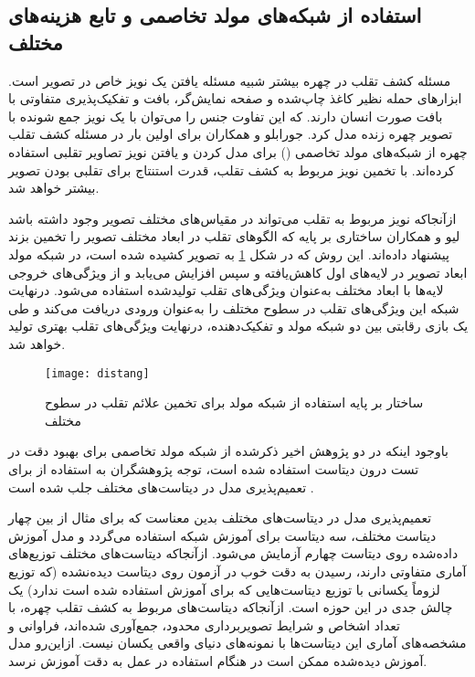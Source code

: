 \subsection{استفاده از شبکه‌های مولد تخاصمی و تابع هزینه‌های مختلف}
مسئله کشف تقلب در چهره بیشتر شبیه مسئله یافتن یک نویز خاص در تصویر است. ابزارهای حمله نظیر کاغذ چاپ‌شده و صفحه نمایش‌گر، بافت و تفکیک‌پذیری متفاوتی با بافت صورت انسان دارند. که این تفاوت جنس را می‌توان با یک نویز جمع شونده با تصویر چهره زنده مدل کرد. جورابلو و همکاران
\cite{jourabloo2018face}
برای اولین بار در مسئله کشف تقلب چهره از شبکه‌های مولد تخاصمی
 ()
\cite{goodfellow2014generative}
برای مدل کردن و یافتن نویز تصاویر تقلبی استفاده کرده‌اند. با تخمین نویز مربوط به کشف تقلب، قدرت استنتاج برای تقلبی بودن تصویر بیشتر خواهد شد.

از‌آنجا‌که نویز مربوط به تقلب می‌تواند در مقیاس‌های مختلف تصویر وجود داشته باشد لیو و همکاران
\cite{liu2020disentangling}
ساختاری بر پایه  که الگوهای تقلب در ابعاد مختلف تصویر را تخمین بزند پیشنهاد داده‌اند. این روش که در شکل 
\ref{fig:distang}
به تصویر کشیده شده است، در شبکه مولد
ابعاد تصویر در لایه‌های اول کاهش‌یافته و سپس افزایش می‌یابد و از ویژگی‌های خروجی لایه‌ها با ابعاد مختلف به‌عنوان ویژگی‌های تقلب تولید‌شده استفاده می‌شود. در‌نهایت شبکه  
این ویژگی‌های تقلب در سطوح مختلف را به‌عنوان ورودی دریافت می‌کند و طی یک بازی رقابتی بین دو شبکه مولد و تفکیک‌دهنده، در‌نهایت ویژگی‌های تقلب بهتری تولید خواهد شد. 
\begin{figure}[h]
	\centerline{\texttt{[image: distang]}}
	\caption{ساختار بر پایه استفاده از شبکه مولد برای تخمین علائم تقلب در سطوح مختلف \cite{liu2020disentangling} }
	\label{fig:distang}
\end{figure}

با‌وجود اینکه در دو پژوهش اخیر ذکر‌شده
\cite{jourabloo2018face,liu2020disentangling}
از شبکه مولد تخاصمی برای بهبود دقت در تست درون دیتاست استفاده شده است، توجه پژوهشگران به استفاده از  برای تعمیم‌پذیری مدل در دیتاست‌های مختلف جلب شده است
\cite{shao2019multi,jia2020single}.

تعمیم‌پذیری مدل در دیتاست‌های مختلف بدین معناست که برای مثال از بین چهار دیتاست مختلف، سه دیتاست برای آموزش شبکه استفاده می‌گردد و مدل آموزش داده‌شده روی دیتاست چهارم آزمایش می‌شود. از‌آنجا‌که دیتاست‌های مختلف توزیع‌های آماری متفاوتی دارند، رسیدن به دقت خوب در آزمون روی دیتاست دیده‌نشده (که توزیع لزوماً یکسانی با توزیع دیتاست‌هایی که برای آموزش استفاده شده است ندارد) یک چالش جدی در این حوزه است. ازآنجاکه دیتاست‌های مربوط به کشف تقلب چهره، با تعداد اشخاص و شرایط تصویر‌برداری محدود، جمع‌آوری شده‌اند، فراوانی و مشخصه‌های آماری این دیتاست‌ها با نمونه‌های دنیای واقعی یکسان نیست. از‌این‌رو مدل آموزش دیده‌شده ممکن است در هنگام استفاده در عمل به دقت آموزش نرسد. 


